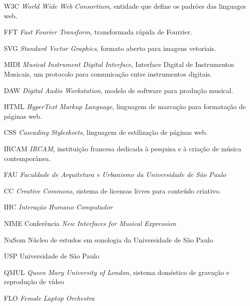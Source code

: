 \documentclass[
	12pt,				%
	openright,			%
	twoside,			%
	a4paper,			%
	english,			%
	french,				%
	spanish,			%
	brazil				%
	]{abntex2}
\begin{document}
\begin{siglas}
\item[W3C] \textit{World Wide Web Consortium}, entidade que define os padrões das linguages web.

\item[FFT] \textit{Fast Fourier Transform}, transformada rápida de Fourrier.
\item[SVG] \textit{Standard Vector Graphics}, formato aberto para imagens vetoriais.
\item[MIDI] \textit{Musical Instrument Digital Interface}, Interface Digital de Instrumentos Musicais, um protocolo para comunicação entre instrumentos digitais.
\item[DAW] \textit{Digital Audio Workstation}, modelo de software para produção musical.
\item[HTML] \textit{HyperText Markup Language}, linguagem de marcação para formatação de páginas web.
\item[CSS] \textit{Cascading Stylesheets}, linguagem de estilização de páginas web.
\item[IRCAM] \textit{IRCAM}, instituição francesa dedicada à pesquisa e à criação de música contemporânea.
\item[FAU] \textit{Faculdade de Arquitetura e Urbanismo da Universidade de São Paulo}
\item[CC] \textit{Creative Commons}, sistema de licensas livres para conteúdo criativo. 
\item[IHC] \textit{Interação Humano Computador}
\item[NIME] Conferência \textit{New Interfaces for Musical Expression}
\item[NuSom] Núcleo de estudos em sonologia da Universidade de São Paulo
\item[USP] Universidade de São Paulo
\item[QMUL] \textit{Queen Mary University of London}, sistema doméstico de gravação e reprodução de vídeo
\item[FLO] \textit{Female Laptop Orchestra}

\end{siglas}

\end{document}
